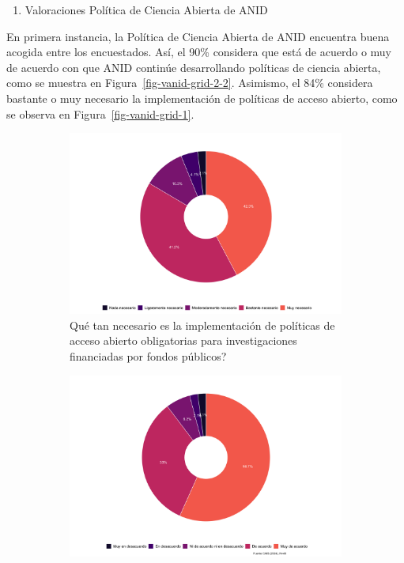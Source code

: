 \documentclass[
  letterpaper,
  DIV=11,
  numbers=noendperiod]{scrreprt}
\providecommand{\tightlist}{%
  \setlength{\itemsep}{0pt}\setlength{\parskip}{0pt}}\usepackage{longtable,booktabs,array}
\begin{document}
\begin{enumerate}
\def\labelenumi{\alph{enumi})}
\setcounter{enumi}{2}
\tightlist
\item
  Valoraciones Política de Ciencia Abierta de ANID
\end{enumerate}

En primera instancia, la Política de Ciencia Abierta de ANID encuentra
buena acogida entre los encuestados. Así, el 90\% considera que está de
acuerdo o muy de acuerdo con que ANID continúe desarrollando políticas
de ciencia abierta, como se muestra en Figura~\ref{fig-vanid-grid-2-2}.
Asimismo, el 84\% considera bastante o muy necesario la implementación
de políticas de acceso abierto, como se observa en
Figura~\ref{fig-vanid-grid-1}.

\begin{figure}

{\centering 

\begin{figure}

{\centering \includegraphics{paper_files/figure-pdf/fig-vanid-grid-1.png}

}

\caption{Qué tan necesario es la implementación de políticas de acceso
abierto obligatorias para investigaciones financiadas por fondos
públicos?}

\end{figure}

\begin{figure}

{\centering \includegraphics{paper_files/figure-pdf/fig-vanid-grid-2.png}

}
\end{figure}}
\end{figure}
\end{document}
